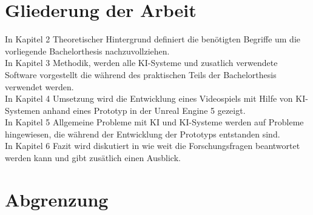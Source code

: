 \section{Gliederung der Arbeit}%
In Kapitel 2 Theoretischer Hintergrund definiert die benötigten Begriffe um die vorliegende Bachelorthesis nachzuvollziehen.
\\
In Kapitel 3 Methodik, werden alle KI-Systeme und zusatlich verwendete Software vorgestellt die während des praktischen Teils der Bachelorthesis verwendet werden.
\\
In Kapitel 4 Umsetzung wird die Entwicklung eines Videospiels mit Hilfe von KI-Systemen anhand eines Prototyp in der Unreal Engine 5 gezeigt.
\\
In Kapitel 5 Allgemeine Probleme mit KI und KI-Systeme werden auf Probleme hingewiesen, die während der Entwicklung der Prototyps entstanden sind.
\\
In Kapitel 6 Fazit wird diskutiert in wie weit die Forschungsfragen beantwortet werden kann und gibt zusätlich einen Ausblick.
\section{Abgrenzung}
